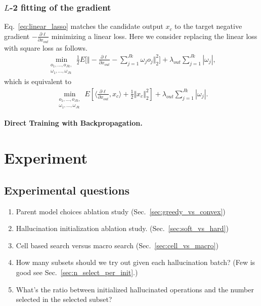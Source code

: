 \documentclass{article}
\begin{document}
\subsubsection{$L$-2 fitting of the gradient}
Eq.~\ref{eq:linear_lasso} matches the candidate output $x_c$ to the target negative gradient $-\frac{\partial \ell}{\partial x_{out}}$ minimizing a linear loss. Here we consider replacing the linear loss with square loss as follows.
\begin{align}
\min _{
    \substack{o_1,...,o_{Jk}, \\ \omega_1,..., \omega_{Jk}}
    } 
    \frac{1}{2}E \big[ 
     \Vert 
        - \frac{\partial \ell}{\partial x_{out}} - 
        \sum _{j = 1}^{Jk} \omega_j o_j
    \Vert^2_2 \big] 
    + \lambda_{out} \sum _{j = 1}^{Jk} | \omega_j |, 
\end{align}
which is equivalent to 
\begin{align}
\label{eq:quadratic_lasso}
\min _{
    \substack{o_1,...,o_{Jk}, \\ \omega_1,..., \omega_{Jk}}
    } 
    E [\langle 
        \frac{\partial \ell}{\partial x_{out}} , 
        x_c
    \rangle 
    + \frac{1}{2} \Vert x_c \Vert^2_2] 
    + \lambda_{out} \sum _{j = 1}^{Jk} | \omega_j |.
\end{align}

\textbf{Direct Training with Backpropagation.}





    
\section{Experiment}

\subsection{Experimental questions}
\begin{enumerate}
\item Parent model choices ablation study (Sec.~\ref{sec:greedy_vs_convex})
\item Hallucination initialization ablation study. (Sec.~\ref{sec:soft_vs_hard})
\item Cell based search versus macro search (Sec.~\ref{sec:cell_vs_macro})
\item How many subsets should we try out given each hallucination batch? (Few is good see Sec.~\ref{sec:n_select_per_init}.)
\item What's the ratio between initialized hallucinated operations and the number selected in the selected subset?
    
\end{enumerate}
\end{document}
